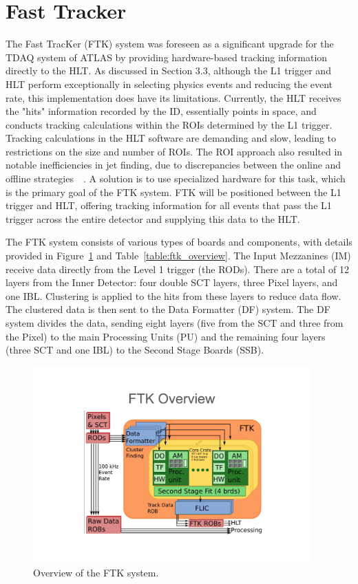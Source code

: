 \section{Fast Tracker}

The Fast TracKer (FTK) system was foreseen as a significant upgrade for the TDAQ system of ATLAS by providing hardware-based tracking information directly to the HLT.
As discussed in Section 3.3, although the L1 trigger and HLT perform exceptionally in selecting physics events and reducing the event rate, this implementation does have its limitations.
Currently, the HLT receives the "hits" information recorded by the ID, essentially points in space, and conducts tracking calculations within the ROIs determined by the L1 trigger.
Tracking calculations in the HLT software are demanding and slow, leading to restrictions on the size and number of ROIs. 
The ROI approach also resulted in notable inefficiencies in jet finding, due to discrepancies between the online and offline strategies~\cite{TAMSETT2013253}~\cite{Aad2016}.
A solution is to use specialized hardware for this task, which is the primary goal of the FTK system. FTK will be positioned between the L1 trigger and HLT, offering tracking information for all events that pass the L1 trigger across the entire detector and supplying this data to the HLT.

The FTK system consists of various types of boards and components, with details provided in Figure~\ref{fig:ftk_overview} and Table~\ref{table:ftk_overview}. The Input Mezzanines (IM) receive data directly from the Level 1 trigger (the RODs). There are a total of 12 layers from the Inner Detector: four double SCT layers, three Pixel layers, and one IBL.
Clustering is applied to the hits from these layers to reduce data flow. The clustered data is then sent to the Data Formatter (DF) system.
The DF system divides the data, sending eight layers (five from the SCT and three from the Pixel) to the main Processing Units (PU) and the remaining four layers (three SCT and one IBL) to the Second Stage Boards (SSB).

\begin{figure}[ht]
  \centering
  \includegraphics[width=0.95\textwidth]{figures/ftk/ftk_overview.pdf}
  \caption{Overview of the FTK system.}
  \label{fig:ftk_overview}
\end{figure}


